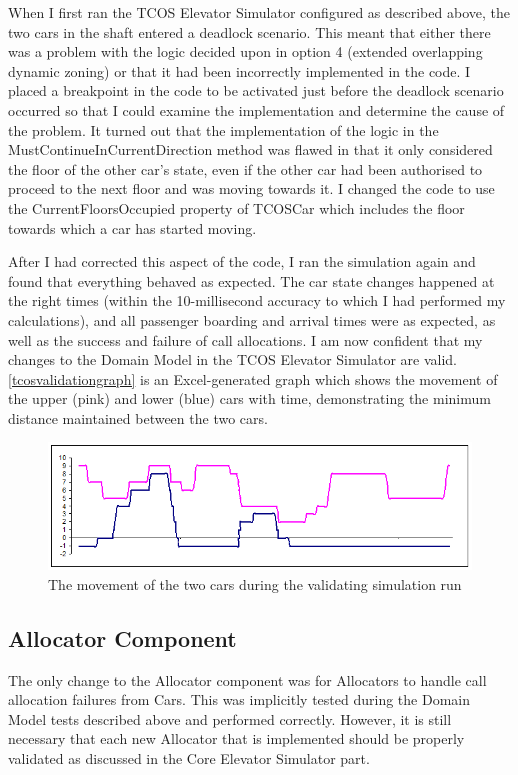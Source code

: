 \documentclass{UoYCSproject}
\begin{document}
When I first ran the TCOS Elevator Simulator configured as described above, the two cars in the shaft entered a deadlock scenario.  This meant that either there was a problem with the logic decided upon in option 4 (extended overlapping dynamic zoning) or that it had been incorrectly implemented in the code.  I placed a breakpoint in the code to be activated just before the deadlock scenario occurred so that I could examine the implementation and determine the cause of the problem.  It turned out that the implementation of the logic in the MustContinueInCurrentDirection method was flawed in that it only considered the floor of the other car's state, even if the other car had been authorised to proceed to the next floor and was moving towards it.  I changed the code to use the CurrentFloorsOccupied property of TCOSCar which includes the floor towards which a car has started moving.

After I had corrected this aspect of the code, I ran the simulation again and found that everything behaved as expected.  The car state changes happened at the right times (within the 10-millisecond accuracy to which I had performed my calculations), and all passenger boarding and arrival times were as expected, as well as the success and failure of call allocations.  I am now confident that my changes to the Domain Model in the TCOS Elevator Simulator are valid.  \autoref{tcosvalidationgraph} is an Excel-generated graph which shows the movement of the upper (pink) and lower (blue) cars with time, demonstrating the minimum distance maintained between the two cars.

\begin{figure} [h]
	\centering
	\includegraphics{tcos_validation_movement_graph.png}
	\caption{The movement of the two cars during the validating simulation run}
	\label{tcosvalidationgraph}
\end{figure}

\subsection{Allocator Component}
The only change to the Allocator component was for Allocators to handle call allocation failures from Cars.  This was implicitly tested during the Domain Model tests described above and performed correctly.  However, it is still necessary that each new Allocator that is implemented should be properly validated as discussed in the Core Elevator Simulator part.
\end{document}
